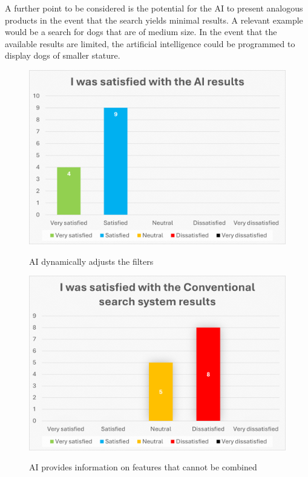 \documentclass[../../submission.tex]{subfiles}
\begin{document}
A further point to be considered is the potential for the AI to present analogous 
products in the event that the search yields minimal results. A relevant example  
would be a search for dogs that are of medium size. In the event that the available 
results are limited, the artificial intelligence could be programmed to display dogs of 
smaller stature.

\begin{figure}[h]
    \centering
    \begin{minipage}{0.45\textwidth}
        \includegraphics[width=\textwidth]{images/result_ki}
        \caption{AI dynamically adjusts the filters}
        \label{fig:result_KI}
    \end{minipage}
    \hfill
    \begin{minipage}{0.45\textwidth}
        \includegraphics[width=\textwidth]{images/result_konv}
        \caption{AI provides information on features that cannot be combined}
        \Description{}
        \label{fig:result_Konv}
    \end{minipage}
\end{figure}
\end{document}
